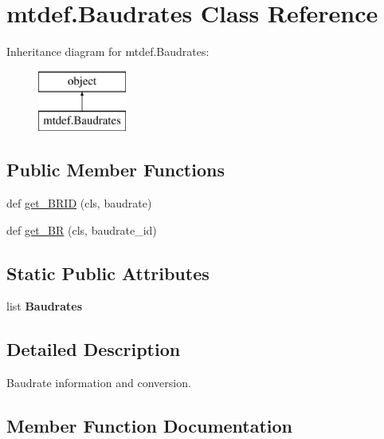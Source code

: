 \hypertarget{classmtdef_1_1Baudrates}{}\section{mtdef.\+Baudrates Class Reference}
\label{classmtdef_1_1Baudrates}
Inheritance diagram for mtdef.\+Baudrates\+:\begin{figure}[H]
\begin{center}
\leavevmode
\includegraphics[height=2.000000cm]{classmtdef_1_1Baudrates}
\end{center}
\end{figure}
\subsection*{Public Member Functions}
\begin{DoxyCompactItemize}
\item 
def \hyperlink{classmtdef_1_1Baudrates_a32406f03907e8933f4216099b7a657a1}{get\+\_\+\+B\+R\+ID} (cls, baudrate)
\item 
def \hyperlink{classmtdef_1_1Baudrates_a9dff0be3c3e3dac46345f45e1f3fd481}{get\+\_\+\+BR} (cls, baudrate\+\_\+id)
\end{DoxyCompactItemize}
\subsection*{Static Public Attributes}
\begin{DoxyCompactItemize}
\item 
list {\bfseries Baudrates}
\end{DoxyCompactItemize}


\subsection{Detailed Description}
\begin{DoxyVerb}Baudrate information and conversion.\end{DoxyVerb}
 

\subsection{Member Function Documentation}
\mbox{\label{classmtdef_1_1Baudrates_a9dff0be3c3e3dac46345f45e1f3fd481}} 
